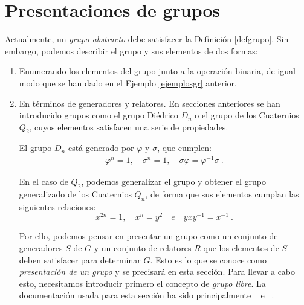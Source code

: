 

\chapter{Presentaciones de grupos} \label{pg}



Actualmente, un \textit{grupo abstracto} debe satisfacer la Definición \ref{defgrupo}. Sin embargo, podemos describir el grupo y sus elementos de dos formas:

\begin{enumerate} \label{haydos}
    \item Enumerando los elementos del grupo junto a la operación binaria, de igual modo que se han dado en el Ejemplo \ref{ejemplosgr} anterior. %
    \item En términos de generadores y relatores. En secciones anteriores se han introducido grupos como el grupo Diédrico $D_n$ o el grupo de los Cuaternios $Q_2$, cuyos elementos satisfacen una serie de propiedades.

El grupo $D_n$ está generado por $\varphi$ y $\sigma$, que cumplen: 
\begin{align*} \label{alli}
    \varphi^n=1, \quad \sigma^n=1, \quad \sigma \varphi = \varphi^{-1}\sigma \:.
\end{align*}

En el caso de $Q_2$, podemos generalizar el grupo y obtener el grupo generalizado de los Cuaternios $Q_n$, de forma que sus elementos cumplan las siguientes relaciones:
\[
    x^{2n}=1, \quad x^n=y^2 \quad e \quad yxy^{-1}=x^{-1} \:.
\]

Por ello, podemos pensar en presentar un grupo como un conjunto de generadores $S$ de $G$ y un conjunto de relatores $R$ que los elementos de $S$ deben satisfacer para determinar $G$.  Esto es lo que se conoce como \textit{presentación de un grupo} y se precisará en esta sección. Para llevar a cabo esto, necesitamos introducir primero el concepto de \textit{grupo libre}. La documentación usada para esta sección ha sido principalmente ~\cite{free} e ~\cite{carlos}.
    
\end{enumerate}


